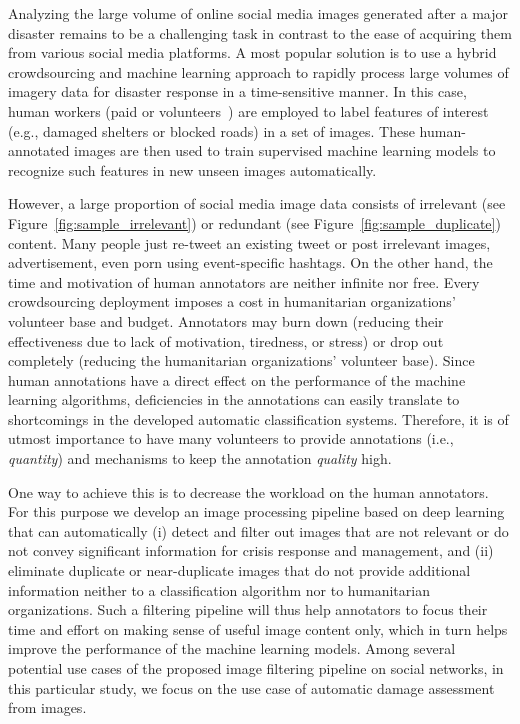 \documentclass{iscram}
\begin{document}
Analyzing the large volume of online social media images generated after a major disaster remains to be a challenging task in contrast to the ease of acquiring them from various social media platforms. A most popular solution is to use a hybrid crowdsourcing and machine learning approach to rapidly process large volumes of imagery data for disaster response in a time-sensitive manner. In this case, human workers (paid or volunteers~\parencite{reuter2015xhelp}) are employed to label features of interest (e.g., damaged shelters or blocked roads) in a set of images.
These human-annotated images are then used to train supervised machine learning models to recognize such features in new unseen images automatically.

However, a large proportion of social media image data consists of irrelevant (see Figure~\ref{fig:sample_irrelevant}) or redundant (see Figure~\ref{fig:sample_duplicate}) content. Many people just re-tweet an existing tweet or post irrelevant images, advertisement, even porn using event-specific hashtags. On the other hand, the time and motivation of human annotators are neither infinite nor free. Every crowdsourcing deployment imposes a cost in humanitarian organizations' volunteer base and budget. Annotators may burn down (reducing their effectiveness due to lack of motivation, tiredness, or stress) or drop out completely (reducing the humanitarian organizations' volunteer base). Since human annotations have a direct effect on the performance of the machine learning algorithms, deficiencies in the annotations can easily translate to shortcomings in the developed automatic classification systems. Therefore, it is of utmost importance to have many volunteers to provide annotations (i.e., \emph{quantity}) and mechanisms to keep the annotation \emph{quality} high.

One way to achieve this is to decrease the workload on the human annotators. For this purpose we develop an image processing pipeline based on deep learning that can automatically (i) detect and filter out images that are not relevant or do not convey significant information for crisis response and management, and (ii) eliminate duplicate or near-duplicate images that do not provide additional information neither to a classification algorithm nor to humanitarian organizations. Such a filtering pipeline will thus help annotators to focus their time and effort on making sense of useful image content only, which in turn helps improve the performance of the machine learning models. Among several potential use cases of the proposed image filtering pipeline on social networks, in this particular study, we focus on the use case of automatic damage assessment from images.
\end{document}
